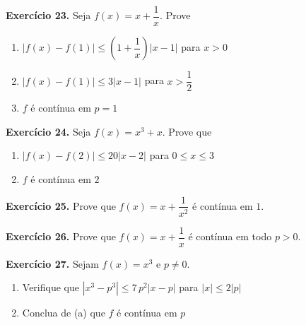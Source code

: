 \documentclass[12pt,a4paper]{article}
\begin{document}
\vspace{0.5cm}
\noindent\textbf{Exercício 23.} Seja $f(x) = x + \dfrac{1}{x}$. Prove
\begin{enumerate}
    \renewcommand{\theenumi}{\alph{enumi}}
    \renewcommand{\labelenumi}{\theenumi)}
    \item $|f(x) - f(1)| \le \left(1 + \dfrac{1}{x}\right)|x - 1|$ para $x > 0$
    \item $|f(x) - f(1)| \le 3|x - 1|$ para $x > \dfrac{1}{2}$
    \item $f$ é contínua em $p = 1$
\end{enumerate}

\vspace{0.5cm}
\noindent\textbf{Exercício 24.} Seja $f(x) = x^3 + x$. Prove que
\begin{enumerate}
    \renewcommand{\theenumi}{\alph{enumi}}
    \renewcommand{\labelenumi}{\theenumi)}
    \item $|f(x) - f(2)| \le 20|x - 2|$ para $0 \le x \le 3$
    \item $f$ é contínua em $2$
\end{enumerate}

\vspace{0.5cm}
\noindent\textbf{Exercício 25.}
Prove que $f(x) = x + \dfrac{1}{x^2}$ é contínua em $1$.

\vspace{0.5cm}
\noindent\textbf{Exercício 26.}
Prove que $f(x) = x + \dfrac{1}{x}$ é contínua em todo $p > 0$.

\vspace{0.5cm}
\noindent\textbf{Exercício 27.} Sejam $f(x) = x^3$ e $p \neq 0$.
\begin{enumerate}
    \renewcommand{\theenumi}{\alph{enumi}}
    \renewcommand{\labelenumi}{\theenumi)}
    \item Verifique que $|x^3 - p^3| \le 7\,p^2|x - p|$ para $|x| \le 2|p|$
    \item Conclua de (a) que $f$ é contínua em $p$
\end{enumerate}
\end{document}
